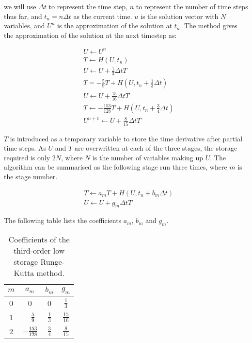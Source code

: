 \noindent
we will use \(\Delta t\) to represent the time step, \(n\) to represent the number of time steps
thus far, and \(t_n = n \Delta t\) as the current time. \(u\) is the solution vector with \(N\)
variables, and \(U^n\) is the approximation of the solution at \(t_n\). The method gives the
approximation of the solution at the next timestep as:

\begin{equation} \label{equ:runge_kutta}
    \begin{split}
        & U \leftarrow U^n \\
        & T \leftarrow H \left( U, t_n \right) \\
        & U \leftarrow U + \frac{1}{3} \Delta t T \\
        & T = -\frac{5}{9} T + H \left( U, t_n + \frac{1}{3} \Delta t \right) \\
        & U \leftarrow U + \frac{15}{16} \Delta t T \\
        & T \leftarrow -\frac{153}{128} T + H \left( U, t_n + \frac{3}{4} \Delta t \right) \\
        & U^{n + 1} \leftarrow U + \frac{8}{15} \Delta t T
    \end{split}
\end{equation}

\(T\) is introduced as a temporary variable to store the time derivative after partial time steps.
As \(U\) and \(T\) are overwritten at each of the three stages, the storage required is only \(2
N\), where \(N\) is the number of variables making up \(U\). The algorithm can be summarised as the
following stage run three times, where \(m\) is the stage number.

\begin{equation} \label{equ:runge_kutta_stage}
    \begin{split}
        & T \leftarrow a_m T + H \left( U, t_n + b_m \Delta t \right) \\
        & U \leftarrow U + g_m \Delta t T
    \end{split}
\end{equation}

The following table lists the coefficients \(a_m\), \(b_m\) and \(g_m\).

\begin{table}[H]
    \centering
    \begin{tabular}{c c c c}
        \(m\) & \(a_m\) & \(b_m\) & \(g_m\) \\
        \midrule
        0 & 0 & 0 & \(\frac{1}{3}\) \\
        1 & \(-\frac{5}{9}\) & \(\frac{1}{3}\) & \(\frac{15}{16}\) \\
        2 & \(-\frac{153}{128}\) & \(\frac{3}{4}\) & \(\frac{8}{15}\) \\
    \end{tabular}
    \caption{Coefficients of the third-order low storage Runge-Kutta method.}\label{table:runge_kutta_coefficient}
\end{table}

